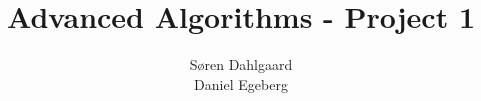 \documentclass{sig-alternate}
\begin{document}
\title{Advanced Algorithms - Project 1}


\author{
\alignauthor
Søren Dahlgaard\\
\alignauthor
Daniel Egeberg\\
}

\maketitle

\begin{abstract}

\end{abstract}

\end{document}
